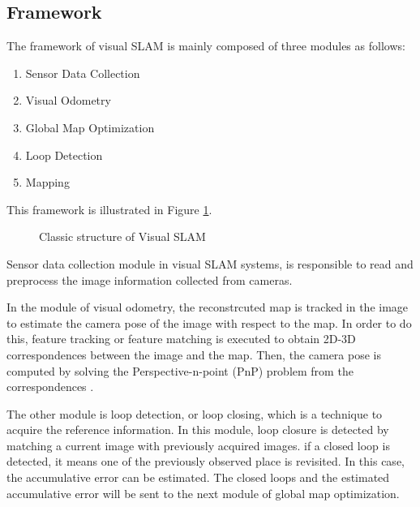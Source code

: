 \subsection{Framework}

The framework of visual SLAM is mainly composed of three modules as follows:
\begin{enumerate}[1.]
	\item Sensor Data Collection
	\item Visual Odometry
	\item Global Map Optimization
	\item Loop Detection
	\item Mapping
\end{enumerate}
 This framework is illustrated in Figure \ref{fig:vslamframe}.

\begin{figure}[!ht]
  \centering
      \caption{Classic structure of Visual SLAM}
      \label{fig:vslamframe}
\end{figure}

Sensor data collection module in visual SLAM systems, is responsible to read and preprocess the image information collected from cameras.

In the module of visual odometry, the reconstrcuted map is tracked in the image to estimate the camera pose of the image with respect to the map. In order to do this, feature tracking or feature matching is executed to obtain 2D-3D correspondences between the image and the map. Then, the camera pose is computed by solving the Perspective-n-point (PnP) problem from the correspondences \cite{klette1998three,nister2007minimal}.

The other module is loop detection, or loop closing, which is a technique to acquire the reference information. In this module, loop closure is detected by matching a current image with previously acquired images. if a closed loop is detected, it means one of the previously observed place is revisited. In this case, the accumulative error can be estimated. The closed loops and the estimated accumulative error will be sent to the next module of global map optimization.

